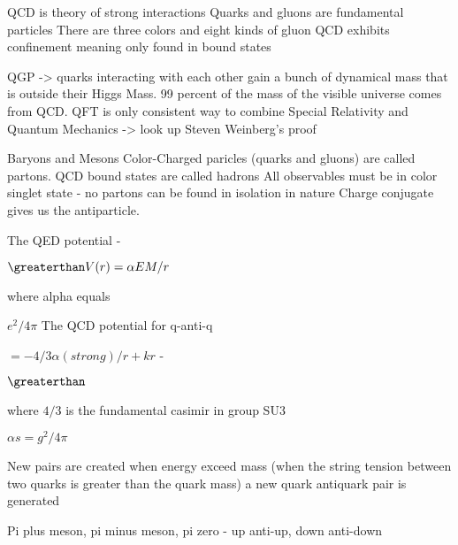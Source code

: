 \documentclass{article}
\begin{document}
QCD is theory of strong interactions
Quarks and gluons are fundamental particles
There are three colors and eight kinds of gluon
QCD exhibits confinement meaning only found in bound states

QGP -> quarks interacting with each other gain a bunch of dynamical mass that is outside their Higgs Mass. 99 percent
of the mass of the visible universe comes from QCD.
QFT is only consistent way to combine Special Relativity and Quantum Mechanics -> look up Steven Weinberg's proof

Baryons and Mesons Color-Charged paricles (quarks and gluons) are called partons.
QCD bound states are called hadrons
All observables must be in color singlet state - no partons can be found in isolation in nature
Charge conjugate gives us the antiparticle.

The QED potential -

\(\greaterthan V(r) = \alpha EM / r\) 

where alpha equals 

\(e^{2}/4\pi\)
The QCD potential for q-anti-q 

\(= -4/3 \alpha(strong)/r + kr\) -

\(\greaterthan\) 

where \(4/3\) is the
fundamental casimir in group SU3

\(\alpha s = g^{2}/4\pi\)

New pairs are created when energy exceed mass (when the string tension between two quarks is greater than the quark mass)
a new quark antiquark pair is generated

Pi plus meson, pi minus meson, pi zero - up anti-up, down anti-down
\end{document}
